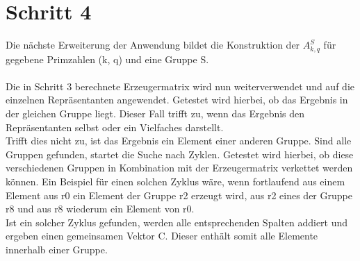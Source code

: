 \section{Schritt 4}
Die nächste Erweiterung der Anwendung bildet die Konstruktion der $A^{S}_{k,q}$ für gegebene Primzahlen (k, q) und eine Gruppe S.\\
\\
Die in Schritt 3 berechnete Erzeugermatrix wird nun weiterverwendet und auf die einzelnen Repräsentanten angewendet. Getestet wird hierbei, ob das Ergebnis in der gleichen Gruppe liegt. Dieser Fall trifft zu, wenn das Ergebnis den Repräsentanten selbst oder ein Vielfaches darstellt. \\
Trifft dies nicht zu, ist das Ergebnis ein Element einer anderen Gruppe. Sind alle Gruppen gefunden, startet die Suche nach Zyklen. Getestet wird hierbei, ob diese verschiedenen Gruppen in Kombination mit der Erzeugermatrix verkettet werden können. Ein Beispiel für einen solchen Zyklus wäre, wenn fortlaufend aus einem Element aus r0 ein Element der Gruppe r2 erzeugt wird, aus r2 eines der Gruppe r8 und aus r8 wiederum ein Element von r0.\\
Ist ein solcher Zyklus gefunden, werden alle entsprechenden Spalten addiert und ergeben einen gemeinsamen Vektor C. Dieser enthält somit alle Elemente innerhalb einer Gruppe.\\
\\
